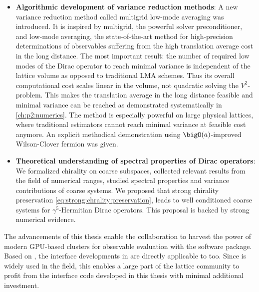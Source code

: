 \begin{itemize}
   \item \textbf{Algorithmic development of variance reduction methods}: A new variance reduction method called multigrid low-mode averaging was introduced. It is inspired by multigrid, the powerful solver preconditioner, and low-mode averaging, the state-of-the-art method for high-precision determinations of observables suffering from the high translation average cost in the long distance. The most important result: the number of required low modes of the Dirac operator to reach minimal variance is independent of the lattice volume as opposed to traditional LMA schemes. Thus its overall computational cost scales linear in the volume, not quadratic solving the $V^{2}$-problem. This makes the translation average in the long distance feasible and minimal variance can be reached as demonstrated systematically in \cref{ch:p2:numerics}. The method is especially powerful on large physical lattices, where traditional estimators cannot reach minimal variance at feasible cost anymore. An explicit methodical demonstration using $\bigO(a)$-improved Wilson-Clover fermion was given.
   \item \textbf{Theoretical understanding of spectral properties of Dirac operators}: We formalized chirality on coarse subspaces, collected relevant results from the field of numerical ranges, studied spectral properties and variance contributions of coarse systems. We proposed that strong chirality preservation \cref{eq:strong:chrality:preservation}, leads to well conditioned coarse systems for $\gamma^{5}$-Hermitian Dirac operators. This proposal is backed by strong numerical evidence.
\end{itemize}


The advancements of this thesis enable the \RCstar collaboration to harvest the power of modern GPU-based clusters for observable evaluation with the \openqxd software package.
Based on \openqcd, the interface developments in \openqxd are directly applicable to \openqcd too.
Since \openqcd is widely used in the field, this enables a large part of the lattice community to profit from the interface code developed in this thesis with minimal additional investment.

